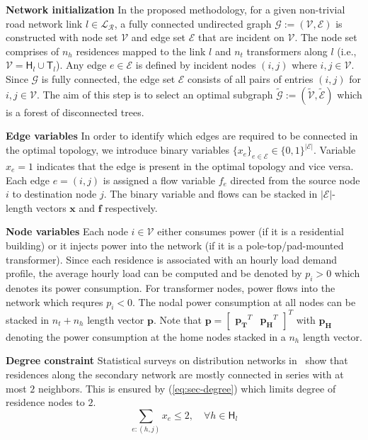\documentclass[sigconf]{acmart}
\begin{document}
\noindent\textbf{Network initialization}
In the proposed methodology, for a given non-trivial road network link $l\in\mathcal{L_R}$, a fully connected undirected graph $\mathcal{G}:=(\mathcal{V},\mathcal{E})$ is constructed with node set $\mathcal{V}$ and edge set $\mathcal{E}$ that are incident on $\mathcal{V}$. The node set comprises of $n_h$ residences mapped to the link $l$ and $n_t$ transformers along $l$ (i.e.,$\mathcal{V}=\mathsf{H}_l\cup\mathsf{T}_l$). Any edge $e\in\mathcal{E}$ is defined by incident nodes $(i,j)$ where $i,j\in\mathcal{V}$. Since $\mathcal{G}$ is fully connected, the edge set $\mathcal{E}$ consists of all pairs of entries $(i,j)$ for $i,j\in\mathcal{V}$. The aim of this step is to select an optimal subgraph $\tilde{\mathcal{G}}:=(\tilde{\mathcal{V}},\tilde{\mathcal{E}})$ which is a forest of disconnected trees.

\noindent\textbf{Edge variables} In order to identify which edges are required to be connected in the optimal topology, we introduce binary variables $\{x_e\}_{e\in\mathcal{E}}\in\{0,1\}^{|\mathcal{E}|}$. Variable $x_e=1$ indicates that the edge is present in the optimal topology and vice versa.
Each edge $e=(i,j)$ is assigned a flow variable $f_e$ directed from the source node $i$ to destination node $j$. The binary variable and flows can be stacked in $|\mathcal{E}|$-length vectors $\mathbf{x}$ and $\mathbf{f}$ respectively.

\noindent\textbf{Node variables} Each node $i\in\mathcal{V}$ either consumes power (if it is a residential building) or it injects power into the network (if it is a pole-top/pad-mounted transformer). Since each residence is associated with an hourly load demand profile, the average hourly load can be computed and be denoted by $p_i>0$ which denotes its power consumption. For transformer nodes, power flows into the network which requres $p_i<0$. The nodal power consumption at all nodes can be stacked in $n_t+n_h$ length vector $\mathbf{p}$. Note that $\mathbf{p}=\begin{bmatrix}\mathbf{p_T}^T &\mathbf{p_H}^T\end{bmatrix}^T$ with $\mathbf{p_H}$ denoting the power consumption at the home nodes stacked in a $n_h$ length vector.

\noindent\textbf{Degree constraint} Statistical surveys on distribution networks in~\cite{mv_2011} show that residences along the secondary network are mostly connected in series with at most $2$ neighbors. This is ensured by (\ref{eq:sec-degree}) which limits degree of residence nodes to $2$.
\begin{equation}
	\sum_{e:(h,j)}x_{e}\leq 2,\quad \forall h\in\mathsf{H}_{l}\label{eq:sec-degree}
\end{equation}
\end{document}
